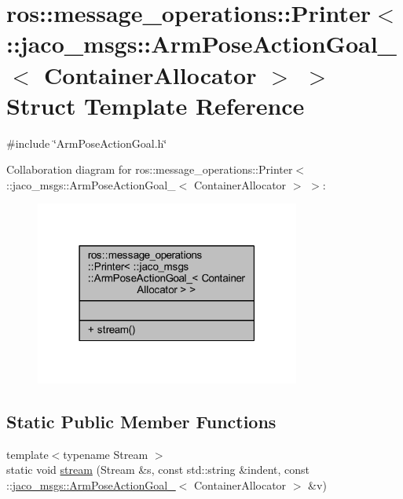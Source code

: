 \hypertarget{structros_1_1message__operations_1_1Printer_3_01_1_1jaco__msgs_1_1ArmPoseActionGoal___3_01ContainerAllocator_01_4_01_4}{}\section{ros\+:\+:message\+\_\+operations\+:\+:Printer$<$ \+:\+:jaco\+\_\+msgs\+:\+:Arm\+Pose\+Action\+Goal\+\_\+$<$ Container\+Allocator $>$ $>$ Struct Template Reference}
\label{structros_1_1message__operations_1_1Printer_3_01_1_1jaco__msgs_1_1ArmPoseActionGoal___3_01ContainerAllocator_01_4_01_4}


{\ttfamily \#include \char`\"{}Arm\+Pose\+Action\+Goal.\+h\char`\"{}}



Collaboration diagram for ros\+:\+:message\+\_\+operations\+:\+:Printer$<$ \+:\+:jaco\+\_\+msgs\+:\+:Arm\+Pose\+Action\+Goal\+\_\+$<$ Container\+Allocator $>$ $>$\+:
\nopagebreak
\begin{figure}[H]
\begin{center}
\leavevmode
\includegraphics[width=247pt]{de/d46/structros_1_1message__operations_1_1Printer_3_01_1_1jaco__msgs_1_1ArmPoseActionGoal___3_01Contai94052fb95d2bc85ee5d0bc9264fad678}
\end{center}
\end{figure}
\subsection*{Static Public Member Functions}
\begin{DoxyCompactItemize}
\item 
{\footnotesize template$<$typename Stream $>$ }\\static void \hyperlink{structros_1_1message__operations_1_1Printer_3_01_1_1jaco__msgs_1_1ArmPoseActionGoal___3_01ContainerAllocator_01_4_01_4_a57d43f31b8fdeebc2bbc3c5975ee7228}{stream} (Stream \&s, const std\+::string \&indent, const \+::\hyperlink{structjaco__msgs_1_1ArmPoseActionGoal__}{jaco\+\_\+msgs\+::\+Arm\+Pose\+Action\+Goal\+\_\+}$<$ Container\+Allocator $>$ \&v)
\end{DoxyCompactItemize}


